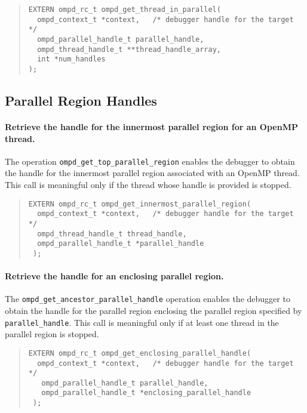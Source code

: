 \documentclass{article}
\begin{document}
\begin{quote}
\begin{verbatim}
EXTERN ompd_rc_t ompd_get_thread_in_parallel(
  ompd_context_t *context,   /* debugger handle for the target */
  ompd_parallel_handle_t parallel_handle, 
  ompd_thread_handle_t **thread_handle_array, 
  int *num_handles
);
\end{verbatim}
\end{quote}

\subsection{Parallel Region Handles}


\paragraph{Retrieve the handle for the innermost parallel region for an OpenMP thread.}
The  operation \verb|ompd_get_top_parallel_region|  enables the debugger to obtain the handle for the innermost parallel region associated with an OpenMP thread. This call is meaningful only if the thread whose handle is provided is stopped.
 
\begin{quote}
\begin{verbatim}
EXTERN ompd_rc_t ompd_get_innermost_parallel_region(
  ompd_context_t *context,   /* debugger handle for the target */
  ompd_thread_handle_t thread_handle,
  ompd_parallel_handle_t *parallel_handle
 );
 \end{verbatim}
 \end{quote}
 
 \paragraph{Retrieve the handle for an enclosing parallel region.}
The  \verb|ompd_get_ancestor_parallel_handle|  operation enables the debugger to obtain the handle for the parallel region enclosing the parallel region specified by \verb|parallel_handle|. This call is meaningful only if at least one thread in the parallel region is stopped.

\begin{quote}
\begin{verbatim}
EXTERN ompd_rc_t ompd_get_enclosing_parallel_handle(
  ompd_context_t *context,   /* debugger handle for the target */
   ompd_parallel_handle_t parallel_handle,
   ompd_parallel_handle_t *enclosing_parallel_handle
 );
 \end{verbatim}
 \end{quote}
 
\end{document}
